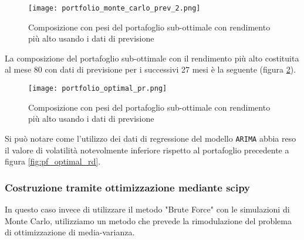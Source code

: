 \begin{figure}[p]
    \centering
    \texttt{[image: portfolio\_monte\_carlo\_prev\_2.png]}
    \caption{Composizione con pesi del portafoglio sub-ottimale con rendimento più alto usando i dati di previsione}
    \label{fig:prev_monte_carlo_2}
\end{figure}

\pagebreak

La composizione del portafoglio sub-ottimale con il rendimento più alto costituita al mese 80 con dati di previsione per
i successivi 27 mesi è la seguente (figura \ref{fig:pf_optimal_pr}).

\begin{figure}[ht]
    \centering
    \texttt{[image: portfolio\_optimal\_pr.png]}
    \caption{Composizione con pesi del portafoglio sub-ottimale con rendimento più alto usando i dati di previsione}
    \label{fig:pf_optimal_pr}
\end{figure}

Si può notare come l'utilizzo dei dati di regressione del modello \verb|ARIMA| abbia reso il valore di volatilità
notevolmente inferiore rispetto al portafoglio precedente a figura \ref{fig:pf_optimal_rd}.

\subsubsection{Costruzione tramite ottimizzazione mediante scipy}

In questo caso invece di utilizzare il metodo "Brute Force" con le simulazioni di Monte Carlo, utilizziamo un metodo
che prevede la rimodulazione del problema di ottimizzazione di media-varianza.

